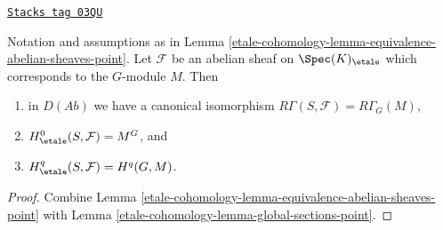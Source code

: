 \begin{lemma}
\label{etale-cohomology-lemma-compare-cohomology-point}
\href{https://stacks.math.columbia.edu/tag/03QU}{\texttt{Stacks tag 03QU}}

Notation and assumptions as in
Lemma \ref{etale-cohomology-lemma-equivalence-abelian-sheaves-point}.
Let $\mathcal{F}$ be an abelian sheaf on $\Spec(K)_\etale$
which corresponds to the $G$-module $M$.
Then
\begin{enumerate}
\item in $D(\textit{Ab})$ we have a canonical isomorphism
$R\Gamma(S, \mathcal{F}) = R\Gamma_G(M)$,
\item $H_\etale^0(S, \mathcal{F}) = M^G$, and
\item $H_\etale^q(S, \mathcal{F}) = H^q(G, M)$.
\end{enumerate}
\end{lemma}

\begin{proof}
Combine
Lemma \ref{etale-cohomology-lemma-equivalence-abelian-sheaves-point}
with
Lemma \ref{etale-cohomology-lemma-global-sections-point}.
\end{proof}

